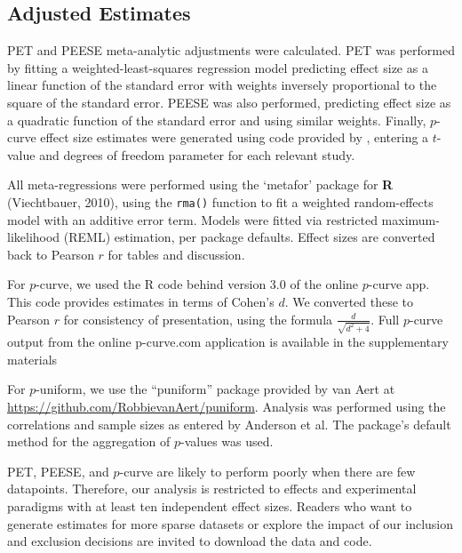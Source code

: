 \documentclass[man, mask]{apa6}
\begin{document}
\subsection{Adjusted Estimates}
PET and PEESE meta-analytic adjustments were calculated. PET was performed by fitting a weighted-least-squares regression model predicting effect size as a linear function of the standard error with weights inversely proportional to the square of the standard error. PEESE was also performed, predicting effect size as a quadratic function of the standard error and using similar weights. Finally, $p$-curve effect size estimates were generated using code provided by \citet{Simonsohn:etal:2014}, entering a $t$-value and degrees of freedom parameter for each relevant study.

All meta-regressions were performed using the `metafor' package for {\bf R} (Viechtbauer, 2010), using the {\tt rma()} function to fit a weighted random-effects model with an additive error term. Models were fitted via restricted maximum-likelihood (REML) estimation, per package defaults. Effect sizes are converted back to Pearson $r$ for tables and discussion. 
\nocite{Viechtbauer:2010} 

For $p$-curve, we used the R code behind version 3.0 of the online $p$-curve app. This code provides estimates in terms of Cohen's $d$. We converted these to Pearson $r$ for consistency of presentation, using the formula $\frac{d}{\sqrt{d^2+4}}$. Full $p$-curve output from the online p-curve.com application is available in the supplementary materials

For $p$-uniform, we use the ``puniform'' package provided by van Aert at \url{https://github.com/RobbievanAert/puniform}. Analysis was performed using the correlations and sample sizes as entered by Anderson et al. The package's default method for the aggregation of $p$-values was used. %

PET, PEESE, and $p$-curve are likely to perform poorly when there are few datapoints. Therefore, our analysis is restricted to effects and experimental paradigms with at least ten independent effect sizes. %
Readers who want to generate estimates for more sparse datasets or explore the impact of our inclusion and exclusion decisions are invited to download the data and code.
\end{document}
